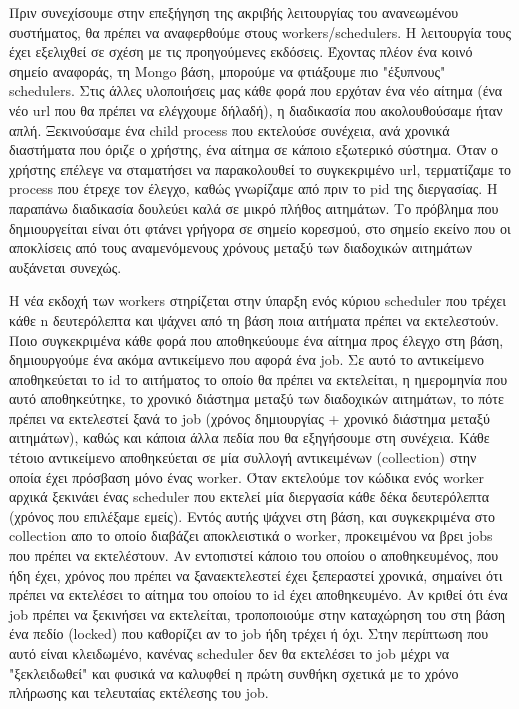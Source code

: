 Πριν συνεχίσουμε στην επεξήγηση της ακριβής λειτουργίας του ανανεωμένου συστήματος, θα πρέπει να αναφερθούμε στους workers/schedulers. Η λειτουργία τους
έχει εξελιχθεί σε σχέση με τις προηγούμενες εκδόσεις. Έχοντας πλέον ένα κοινό σημείο αναφοράς, τη Mongo βάση, μπορούμε να φτιάξουμε πιο "έξυπνους" schedulers.
Στις άλλες υλοποιήσεις μας κάθε φορά που ερχόταν ένα νέο αίτημα (ένα νέο url που θα πρέπει να ελέγχουμε δήλαδή), η διαδικασία που ακολουθούσαμε ήταν απλή. Ξεκινούσαμε ένα child process
που εκτελούσε συνέχεια, ανά χρονικά διαστήματα που όριζε ο χρήστης, ένα αίτημα σε κάποιο εξωτερικό σύστημα. Όταν ο χρήστης επέλεγε να σταματήσει να
παρακολουθεί το συγκεκριμένο url, τερματίζαμε το process που έτρεχε τον έλεγχο, καθώς γνωρίζαμε από πριν το pid της διεργασίας.
Η παραπάνω διαδικασία δουλεύει καλά σε μικρό πλήθος αιτημάτων. Το πρόβλημα που δημιουργείται είναι ότι φτάνει γρήγορα σε σημείο κορεσμού, στο σημείο εκείνο που οι αποκλίσεις από τους αναμενόμενους
χρόνους μεταξύ των διαδοχικών αιτημάτων αυξάνεται συνεχώς.

Η νέα εκδοχή των workers στηρίζεται στην ύπαρξη ενός κύριου
scheduler που τρέχει κάθε n δευτερόλεπτα και ψάχνει από τη βάση ποια αιτήματα πρέπει να εκτελεστούν. Ποιο συγκεκριμένα κάθε φορά που αποθηκεύουμε ένα αίτημα προς έλεγχο στη βάση,
δημιουργούμε ένα ακόμα αντικείμενο που αφορά ένα job. Σε αυτό το αντικείμενο αποθηκεύεται το id το αιτήματος το οποίο θα πρέπει να εκτελείται, η ημερομηνία που
αυτό αποθηκεύτηκε, το χρονικό διάστημα μεταξύ των διαδοχικών αιτημάτων, το πότε πρέπει να εκτελεστεί ξανά το job (χρόνος δημιουργίας + χρονικό διάστημα μεταξύ αιτημάτων),
καθώς και κάποια άλλα πεδία που θα εξηγήσουμε στη συνέχεια. Κάθε τέτοιο αντικείμενο αποθηκεύεται σε μία συλλογή αντικειμένων (collection) στην οποία έχει πρόσβαση μόνο ένας
worker. Όταν εκτελούμε τον κώδικα ενός worker αρχικά ξεκινάει ένας scheduler που εκτελεί μία διεργασία κάθε δέκα δευτερόλεπτα (χρόνος που επιλέξαμε εμείς). Εντός αυτής ψάχνει στη βάση,
και συγκεκριμένα στο collection απο το οποίο διαβάζει αποκλειστικά ο worker, προκειμένου να βρει jobs που πρέπει να εκτελέστουν. Αν εντοπιστεί κάποιο του οποίου ο αποθηκευμένος, που ήδη έχει, χρόνος που πρέπει να ξαναεκτελεστεί
έχει ξεπεραστεί χρονικά, σημαίνει ότι πρέπει να εκτελέσει το αίτημα του οποίου το id έχει αποθηκευμένο.
Αν κριθεί ότι ένα job πρέπει να ξεκινήσει να εκτελείται, τροποποιούμε στην καταχώρηση του στη βάση ένα πεδίο (locked) που καθορίζει αν το job ήδη τρέχει ή όχι. Στην περίπτωση που αυτό είναι κλειδωμένο, κανένας scheduler
δεν θα εκτελέσει το job μέχρι να "ξεκλειδωθεί" και φυσικά να καλυφθεί η πρώτη συνθήκη σχετικά με το χρόνο πλήρωσης και τελευταίας εκτέλεσης του job.

